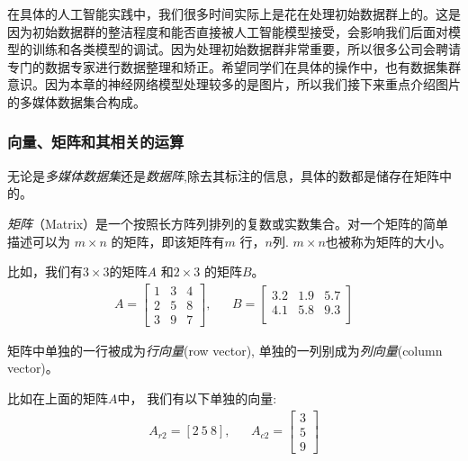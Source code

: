 \documentclass[12pt]{article}
\numberwithin{figure}{section}
\numberwithin{equation}{section}
\begin{document}
在具体的人工智能实践中，我们很多时间实际上是花在处理初始数据群上的。这是因为初始数据群的整洁程度和能否直接被人工智能模型接受，会影响我们后面对模型的训练和各类模型的调试。因为处理初始数据群非常重要，所以很多公司会聘请专门的数据专家进行数据整理和矫正。希望同学们在具体的操作中，也有数据集群意识。因为本章的神经网络模型处理较多的是图片，所以我们接下来重点介绍图片的多媒体数据集合构成。


\subsubsection{向量、矩阵和其相关的运算}

无论是\textit{多媒体数据集}还是\textit{数据阵},除去其标注的信息，具体的数都是储存在矩阵中的。

\begin{definition}
	\textit{矩阵}（Matrix）是一个按照长方阵列排列的复数或实数集合。对一个矩阵的简单描述可以为 $m \times n$ 的矩阵，即该矩阵有$m$ 行，$n$列. $m \times n$也被称为矩阵的大小。
\end{definition}
\begin{example}
比如，我们有$3 \times 3 $的矩阵$A$ 和$2 \times 3$ 的矩阵$B$。
\begin{align*}
	 A = \begin{bmatrix}
	1 & 3 & 4 \\
	2 & 5 & 8 \\
	3 & 9 & 7
\end{bmatrix}, & & B = \begin{bmatrix}
	3.2 & 1.9 & 5.7 \\
	4.1 & 5.8 & 9.3 \\
\end{bmatrix}
\end{align*}	
\end{example}

\begin{definition}
	矩阵中单独的一行被成为\textit{行向量}(row vector), 单独的一列别成为\textit{列向量}(column vector)。
\end{definition}
\begin{example}
比如在上面的矩阵$A$中，	我们有以下单独的向量:
\begin{align*}
	A_{r2} = [2 \ 5 \ 8],  & & A_{c2} = \begin{bmatrix}
		3 \\
		5 \\
		9 
	\end{bmatrix}
\end{align*}
\end{example}
\end{document}
